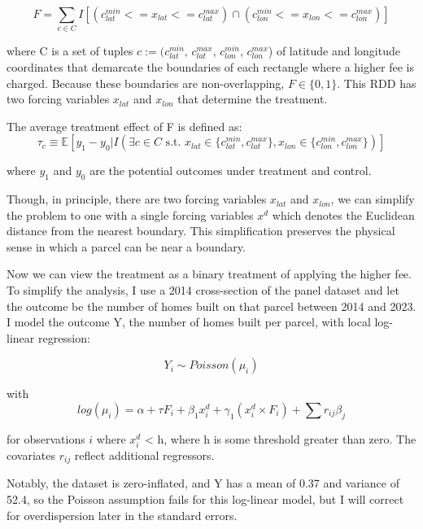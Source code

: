 \documentclass[a4paper,12pt]{article}
\begin{document}
\begin{equation}
F = \sum_{c \in C} I[(c^{min}_{lat} <= x_{lat} <= c^{max}_{lat}) \cap (c^{min}_{lon} <= x_{lon} <= c^{max}_{lon})]
\end{equation}

where C is a set of tuples $c:=(c^{min}_{lat}$, $c^{max}_{lat}$, $c^{min}_{lon} $, $c^{max}_{lon}$) of latitude and longitude coordinates that demarcate the boundaries of each rectangle where a higher fee is charged. Because these boundaries are non-overlapping, $F \in \{0, 1\}$. This RDD has two forcing variables $x_{lat}$ and $x_{lon}$ that determine the treatment.

The average treatment effect of F is defined as:
\begin{equation}
\tau_{c} \equiv \mathbb{E}[y_{1} - y_{0} \bigg| I(\exists c \in C \text{ s.t. } x_{lat} \in \{c^{min}_{lat}, c^{max}_{lat}\}, x_{lon} \in \{c^{min}_{lon}, c^{max}_{lon}\}) ]
\end{equation}

where $y_1$ and $y_0$ are the potential outcomes under treatment and control.

Though, in principle, there are two forcing variables $x_{lat}$ and $x_{lon}$, we can simplify the problem to one with a single forcing variables $x^{d}$ which denotes the Euclidean distance from the nearest boundary. This simplification preserves the physical sense in which a parcel can be near a boundary.

Now we can view the treatment as a binary treatment of applying the higher fee. To simplify the analysis, I use a 2014 cross-section of the panel dataset and let the outcome be the number of homes built on that parcel between 2014 and 2023. I model the outcome Y, the number of homes built per parcel, with local log-linear regression:

\begin{equation}
Y_i \sim {Poisson(\mu_i)}
\end{equation}

with 
\begin{equation}
log(\mu_i) = \alpha + \tau F_i + \beta_1 x^{d}_{i} + \gamma_1 (x^{d}_{i} \times F_i) + \sum{r_{ij}\beta_j}
\end{equation}

for observations $i$ where $x^{d}_{i}$ < h, where h is some threshold greater than zero. The covariates $r_{ij}$ reflect additional regressors.

Notably, the dataset is zero-inflated, and Y has a mean of 0.37 and variance of 52.4, so the Poisson assumption fails for this log-linear model, but I will correct for overdispersion later in the standard errors.
\end{document}
